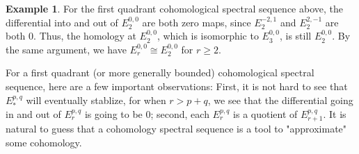 \documentclass{article}
\theoremstyle{definition}
\theoremstyle{definition}
\theoremstyle{definition}
\theoremstyle{definition}
\theoremstyle{definition}
\theoremstyle{definition}
\theoremstyle{definition}
\newtheorem{example}{Example}[section]
\begin{document}

\begin{tcolorbox}[colback=yellow!5!white,colframe=yellow!30!white]
\begin{example}
	For the first quadrant cohomological spectral sequence above, the differential into and out of $E_2^{0,0}$ are both zero maps, since $E_2^{-2,1}$ and $E_2^{2,-1}$ are both $0$. Thus, the homology at $E_2^{0,0}$, which is isomorphic to $E_3^{0,0}$, is still $E_2^{0,0}$. By the same argument, we have $E_r^{0,0}\cong E_2^{0,0}$ for $r\geq 2$. 
\end{example}
\end{tcolorbox}


For a first quadrant (or more generally bounded) cohomological spectral sequence, here are a few important observations: First, it is not hard to see that $E_*^{p,q}$ will eventually stablize, for when $r>{p+q}$, we see that the differential going in and out of $E_r^{p,q}$ is going to be $0$; second, each $E_r^{p,q}$ is a quotient of $E_{r+1}^{p,q}$. It is natural to guess that a cohomology spectral sequence is a tool to "approximate" some cohomology. 
\end{document}
